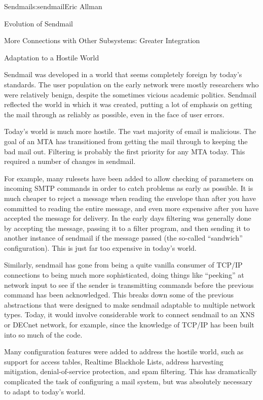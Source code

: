 \begin{aosachapter}{Sendmail}{s:sendmail}{Eric Allman}
\begin{aosasect1}{Evolution of Sendmail}
\begin{aosasect2}{More Connections with Other Subsystems: Greater Integration}
\end{aosasect2}

\begin{aosasect2}{Adaptation to a Hostile World}

Sendmail was developed in a world that seems completely foreign by
today's standards. The user population on the early network were
mostly researchers who were relatively benign, despite the sometimes
vicious academic politics.  Sendmail reflected the world in which it
was created, putting a lot of emphasis on getting the mail through as
reliably as possible, even in the face of user errors.

Today's world is much more hostile. The vast majority of email is
malicious. The goal of an MTA has transitioned from getting the mail
through to keeping the bad mail out. Filtering is probably the first
priority for any MTA today.  This required a number of changes in
sendmail.

For example, many rulesets have been added to allow checking of
parameters on incoming SMTP commands in order to catch problems as
early as possible. It is much cheaper to reject a message when reading
the envelope than after you have committed to reading the entire
message, and even more expensive after you have accepted the message
for delivery. In the early days filtering was generally done by
accepting the message, passing it to a filter program, and then
sending it to another instance of sendmail if the message passed (the
so-called ``sandwich'' configuration). This is just far too expensive
in today's world.

Similarly, sendmail has gone from being a quite vanilla consumer of
TCP/IP connections to being much more sophisticated, doing things like
``peeking'' at network input to see if the sender is transmitting
commands before the previous command has been acknowledged. This
breaks down some of the previous abstractions that were designed to
make sendmail adaptable to multiple network types.  Today, it would
involve considerable work to connect sendmail to an XNS or DECnet
network, for example, since the knowledge of TCP/IP has been built
into so much of the code.

Many configuration features were added to address the hostile world,
such as support for access tables, Realtime Blackhole Lists, address
harvesting mitigation, denial-of-service protection, and spam
filtering.  This has dramatically complicated the task of configuring
a mail system, but was absolutely necessary to adapt to today's world.


\end{aosasect2}
\end{aosasect1}
\end{aosachapter}
